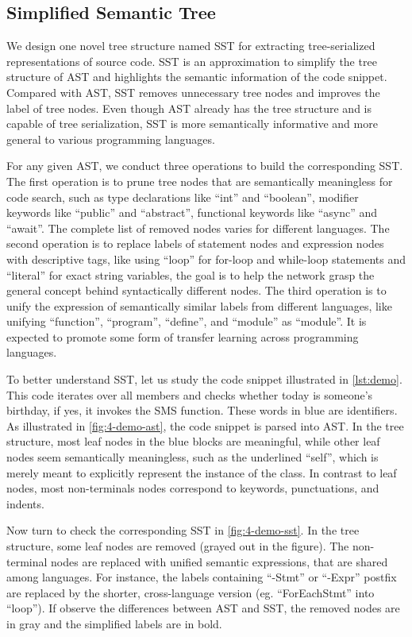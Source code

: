 \documentclass[conference]{IEEEtran}
\begin{document}
\subsection{Simplified Semantic Tree}
We design one novel tree structure named SST for extracting tree-serialized representations of source code. SST is an approximation to simplify the tree structure of AST and highlights the semantic information of the code snippet. Compared with AST, SST removes unnecessary tree nodes and improves the label of tree nodes. Even though AST already has the tree structure and is capable of tree serialization, SST is more semantically informative and more general to various programming languages.

For any given AST, we conduct three operations to build the corresponding SST. The first operation is to prune tree nodes that are semantically meaningless for code search, such as type declarations like ``int'' and ``boolean'', modifier keywords like ``public'' and ``abstract'', functional keywords like ``async'' and ``await''. The complete list of removed nodes varies for different languages. The second operation is to replace labels of statement nodes and expression nodes with descriptive tags, like using ``loop'' for for-loop and while-loop statements and ``literal'' for exact string variables, the goal is to help the network grasp the general concept behind syntactically different nodes. The third operation is to unify the expression of semantically similar labels from different languages, like unifying ``function'', ``program'', ``define'', and ``module'' as ``module''. It is expected to promote some form of transfer learning across programming languages.


To better understand SST, let us study the code snippet illustrated in \autoref{lst:demo}. This code iterates over all members and checks whether today is someone's birthday, if yes, it invokes the SMS function. These words in blue are identifiers. As illustrated in \autoref{fig:4-demo-ast}, the code snippet is parsed into AST. In the tree structure, most leaf nodes in the blue blocks are meaningful, while other leaf nodes seem semantically meaningless, such as the underlined ``self'', which is merely meant to explicitly represent the instance of the class. In contrast to leaf nodes, most non-terminals nodes correspond to keywords, punctuations, and indents.

Now turn to check the corresponding SST in \autoref{fig:4-demo-sst}. In the tree structure, some leaf nodes are removed (grayed out in the figure).
The non-terminal nodes are replaced with unified semantic expressions, that are shared among languages. For instance, the labels containing ``-Stmt'' or ``-Expr'' postfix are replaced by the shorter, cross-language version (eg. ``ForEachStmt'' into ``loop''). If observe the differences between AST and SST, the removed nodes are in gray and the simplified labels are in bold.
\end{document}
